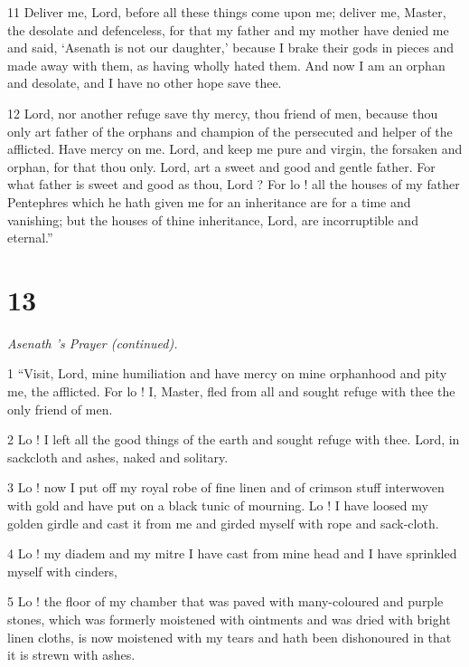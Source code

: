 \par 11 Deliver me, Lord, before all these things come upon me; 
deliver me, Master, the desolate and defenceless, 
for that my father and my mother have denied me and said, 
‘Asenath is not our daughter,’ 
because I brake their gods in pieces and made away with them, 
as having wholly hated them. And now I am an orphan and desolate, and I have no other hope save thee. 

\par 12 Lord, nor another refuge save thy mercy, thou friend of men, 
because thou only art father of the orphans and champion of the persecuted and helper of the afflicted. 
Have mercy on me. Lord, and keep me pure and virgin, 
the forsaken and orphan, for that thou only. 
Lord, art a sweet and good and gentle father. 
For what father is sweet and good as thou, Lord ? 
For lo ! all the houses of my father Pentephres 
which he hath given me for an inheritance are for a time and vanishing; 
but the houses of thine inheritance, Lord, are incorruptible and eternal.”

\chapter{13}

\par \textit{Asenath 's Prayer (continued).}

\par 1 “Visit, Lord, mine humiliation and have mercy on mine orphanhood and pity me, the afflicted. For lo ! I, Master, fled from all and sought refuge with thee the only friend of men. 

\par 2 Lo ! I left all the good things of the earth and sought refuge with thee. Lord, in sackcloth and ashes, naked and solitary. 

\par 3 Lo ! now I put off my royal robe of fine linen and of crimson stuff interwoven with gold and have put on a black tunic of mourning. Lo ! I have loosed my golden girdle and cast it from me and girded myself with rope and sack-cloth. 

\par 4 Lo ! my diadem and my mitre I have cast from mine head and I have sprinkled myself with cinders, 

\par 5 Lo ! the floor of my chamber that was paved with many-coloured and purple stones, which was formerly moistened with ointments and was dried with bright linen cloths, is now moistened with my tears and hath been dishonoured in that it is strewn with ashes. 

